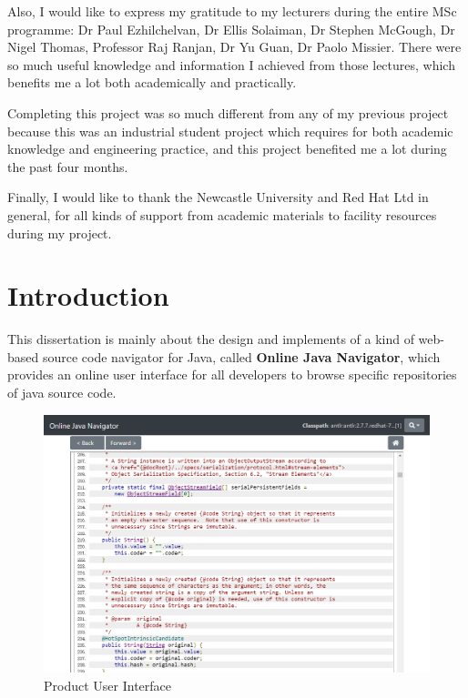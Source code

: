 \documentclass[runningheads]{llncs}
\begin{document}
Also, I would like to express my gratitude to my lecturers during the entire MSc programme: Dr Paul Ezhilchelvan, Dr Ellis Solaiman, Dr Stephen McGough,  Dr Nigel Thomas,  Professor Raj Ranjan,  Dr Yu Guan, Dr Paolo Missier. There were so much useful knowledge and information I achieved from those lectures, which benefits me a lot both academically and practically.

Completing this project was so much different from any of my previous project because this was an industrial student project which requires for both academic knowledge and engineering practice, and this project benefited me a lot during the past four months.

Finally, I would like to thank the Newcastle University and Red Hat Ltd in general, for all kinds of support from academic materials to facility resources during my project.


\newpage
\tableofcontents

\newpage
{}
\setcounter{page}{1}
\section{Introduction}

This dissertation is mainly about the design and implements of a kind of web-based source code navigator for Java, called \textbf{Online Java Navigator}, which provides an online user interface for all developers to browse specific repositories of java source code.

\begin{figure}[H]
	\centering
	\includegraphics[width=12cm]{pic/OJNWebPage.png}
	\caption{Product User Interface}
	\label{product user interface}
\end{figure}
\end{document}

